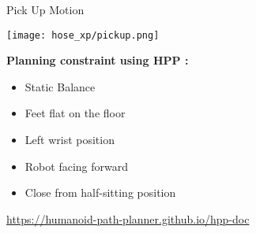 
\begin{frame}{Pick Up Motion}
  \vspace*{0.6cm}
  \begin{center}
    \texttt{[image: hose\_xp/pickup.png]}
  \end{center}
%
  \vspace*{-1ex}
  \textbf{\color{txtcolor2} Planning constraint using HPP :}\\
%  
  \begin{minipage}{0.45\textwidth}
    \begin{itemize}
      \item Static Balance
      \item Feet flat on the floor
      \item Left wrist position
    \end{itemize}
  \end{minipage}
%
  \begin{minipage}{0.50\textwidth}
    \begin{itemize}
      \item Robot facing forward
      \item Close from half-sitting position
    \end{itemize}
    \vspace*{0.4cm}    
  \end{minipage}
%
  \begin{center}
    \small{\color{txtcolor3}\url{https://humanoid-path-planner.github.io/hpp-doc}}
  \end{center}
%
\end{frame}


